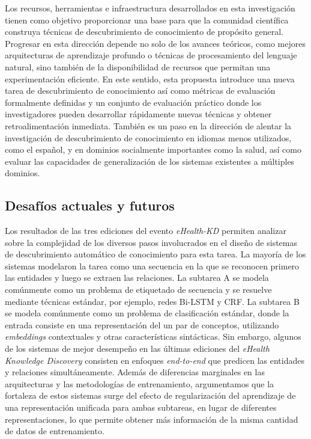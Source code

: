 Los recursos, herramientas e infraestructura desarrollados en esta investigación tienen como objetivo proporcionar una base para que la comunidad científica construya técnicas de descubrimiento de conocimiento de propósito general.
Progresar en esta dirección depende no solo de los avances teóricos, como mejores arquitecturas de aprendizaje profundo o técnicas de procesamiento del lenguaje natural, sino también de la disponibilidad de recursos que permitan una experimentación eficiente.
En este sentido, esta propuesta introduce una nueva tarea de descubrimiento de conocimiento así como métricas de evaluación formalmente definidas y un conjunto de evaluación práctico donde los investigadores pueden desarrollar rápidamente nuevas técnicas y obtener retroalimentación inmediata.
También es un paso en la dirección de alentar la investigación de descubrimiento de conocimiento en idiomas menos utilizados, como el español, y en dominios socialmente importantes como la salud, así como evaluar las capacidades de generalización de los sistemas existentes a múltiples dominios.

\subsection{Desafíos actuales y futuros}

Los resultados de las tres ediciones del evento \textit{eHealth-KD} permiten analizar sobre la complejidad de los diversos pasos involucrados en el diseño de sistemas de descubrimiento automático de conocimiento para esta tarea.
La mayoría de los sistemas modelaron la tarea como una secuencia en la que se reconocen primero las entidades y luego se extraen las relaciones. La subtarea A se modela comúnmente como un problema de etiquetado de secuencia y se resuelve mediante técnicas estándar, por ejemplo, redes Bi-LSTM y CRF. La subtarea B se modela comúnmente como un problema de clasificación estándar, donde la entrada consiste en una representación del un par de conceptos, utilizando \textit{embeddings} contextuales y otras características sintácticas.
Sin embargo, algunos de los sistemas de mejor desempeño en las últimas ediciones del \textit{eHealth Knowledge Discovery} consisten en enfoques \textit{end-to-end} que predicen las entidades y relaciones simultáneamente.
Además de diferencias marginales en las arquitecturas y las metodologías de entrenamiento, argumentamos que la fortaleza de estos sistemas surge del efecto de regularización del aprendizaje de una representación unificada para ambas subtareas, en lugar de diferentes representaciones, lo que permite obtener más información de la misma cantidad de datos de entrenamiento.

